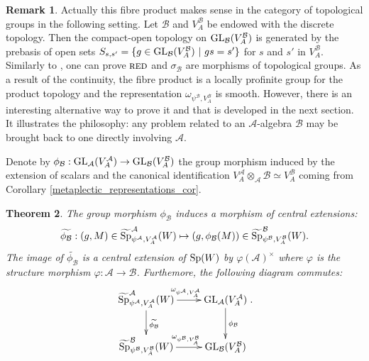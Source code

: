 \documentclass[11pt]{article}
\theoremstyle{plain}
\newtheorem{theo}{Theorem}[section]
\theoremstyle{definition}
\newtheorem{rem}[theo]{Remark}
\theoremstyle{plain}
\theoremstyle{definition}
\theoremstyle{plain}
\begin{document}
\begin{rem} \label{fibre_product_topology_rem} Actually this fibre product makes sense in the category of topological groups in the following setting. Let $\mathcal{B}$ and $V_A^\mathcal{B}$ be endowed with the discrete topology. Then the compact-open topology on $\textup{GL}_\mathcal{B}(V_A^\mathcal{B})$ is generated by the prebasis of open sets $S_{s,s'} = \{ g \in \textup{GL}_\mathcal{B}(V_A^\mathcal{B}) \ | \ gs=s' \}$ for $s$ and $s'$ in $V_A^\mathcal{B}$. Similarly to \cite[Prop. 3.5]{trias_theta1}, one can prove $\textup{\textsc{red}}$ and $\sigma_\mathcal{B}$ are morphisms of topological groups. As a result of the continuity, the fibre product is a locally profinite group for the product topology and the representation $\omega_{\psi^\mathcal{B},V_A^\mathcal{B}}$ is smooth. However, there is an interesting alternative way to prove it and that is developed in the next section. It illustrates the philosophy: any problem related to an $\mathcal{A}$-algebra $\mathcal{B}$ may be brought back to one directly involving $\mathcal{A}$. \end{rem}

Denote by $\phi_\mathcal{B} : \textup{GL}_\mathcal{A}(V_A^\mathcal{A}) \to \textup{GL}_\mathcal{B}(V_A^\mathcal{B})$ the group morphism induced by the extension of scalars and the canonical identification $V_A^\mathcal{A} \otimes_\mathcal{A} \mathcal{B} \simeq V_A^\mathcal{B}$ coming from Corollary \ref{metaplectic_representations_cor}.

\begin{theo} \label{weil_rep_compatib_PhiB_thm} The group morphism $\phi_\mathcal{B}$ induces a morphism of central extensions:
$$\widetilde{\phi_\mathcal{B}} : (g,M) \in \widetilde{\textup{Sp}}_{\psi^\mathcal{A},V_A^\mathcal{A}}^\mathcal{A}(W) \mapsto (g,\phi_\mathcal{B}(M)) \in \widetilde{\textup{Sp}}_{\psi^\mathcal{B},V_A^\mathcal{B}}^\mathcal{B}(W).$$
The image of $\widetilde{\phi_\mathcal{B}}$ is a central extension of $\textup{Sp}(W)$ by $\varphi(\mathcal{A})^\times$ where $\varphi$ is the structure morphism $\varphi : \mathcal{A} \to \mathcal{B}$. Furthemore, the following diagram commutes:
$$\xymatrix{
		\widetilde{\textup{Sp}}_{\psi^\mathcal{A},V_A^\mathcal{A}}^\mathcal{A}(W) \ar[r]^{\omega_{\psi^\mathcal{A},V_A^\mathcal{A}}} \ar[d]^{\widetilde{\phi_\mathcal{B}}} & \textup{GL}_\mathcal{A}(V_A^\mathcal{A})  \ar[d]^{\phi_\mathcal{B}} \\
		\widetilde{\textup{Sp}}_{\psi^\mathcal{B},V_A^\mathcal{B}}^\mathcal{B}(W) \ar[r]^{\omega_{\psi^\mathcal{B},V_A^\mathcal{B}}} & \textup{GL}_\mathcal{B}(V_A^\mathcal{B})
		}.$$ \end{theo}
		
\end{document}

